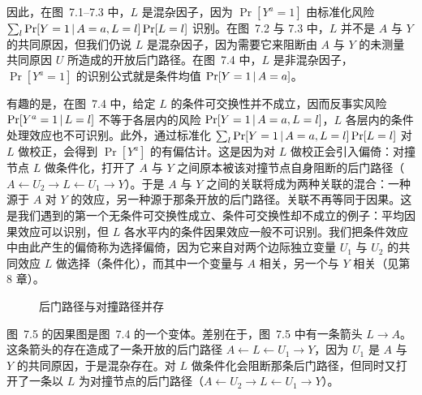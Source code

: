 因此，在图~7.1–7.3 中，$L$ 是混杂因子，因为 $\Pr[Y^{a}=1]$ 由标准化风险 $\sum_l \Pr[Y=1\,|\, A=a,L=l]\Pr[L=l]$ 识别。在图~7.2 与 7.3 中，$L$ 并不是 $A$ 与 $Y$ 的共同原因，但我们仍说 $L$ 是混杂因子，因为需要它来阻断由 $A$ 与 $Y$ 的未测量共同原因 $U$ 所造成的开放后门路径。在图~7.4 中，$L$ 是非混杂因子，$\Pr[Y^{a}=1]$ 的识别公式就是条件均值 $\Pr[Y=1\,|\, A=a]$。


有趣的是，在图~7.4 中，给定 $L$ 的条件可交换性并不成立，因而反事实风险 $\Pr[Y^{a}=1\,|\, L=l]$ 不等于各层内的风险 $\Pr[Y=1\,|\, A=a,L=l]$，$L$ 各层内的条件处理效应也不可识别。此外，通过标准化 $\sum_l \Pr[Y=1\,|\, A=a,L=l]\Pr[L=l]$ 对 $L$ 做校正，会得到 $\Pr[Y^{a}]$ 的有偏估计。这是因为对 $L$ 做校正会引入偏倚：对撞节点 $L$ 做条件化，打开了 $A$ 与 $Y$ 之间原本被该对撞节点自身阻断的后门路径（$A\leftarrow U_2\to L\leftarrow U_1\to Y$）。于是 $A$ 与 $Y$ 之间的关联将成为两种关联的混合：一种源于 $A$ 对 $Y$ 的效应，另一种源于那条开放的后门路径。关联不再等同于因果。这是我们遇到的第一个无条件可交换性成立、条件可交换性却不成立的例子：平均因果效应可以识别，但 $L$ 各水平内的条件因果效应一般不可识别。我们把条件效应中由此产生的偏倚称为选择偏倚，因为它来自对两个边际独立变量 $U_1$ 与 $U_2$ 的共同效应 $L$ 做选择（条件化），而其中一个变量与 $A$ 相关，另一个与 $Y$ 相关（见第 8 章）。

\begin{figure}[htbp]
\centering
{}
\caption{后门路径与对撞路径并存}
\label{fig:7.5}
\end{figure}

图~7.5 的因果图是图~7.4 的一个变体。差别在于，图~7.5 中有一条箭头 $L\to A$。这条箭头的存在造成了一条开放的后门路径 $A\leftarrow L\leftarrow U_1\to Y$，因为 $U_1$ 是 $A$ 与 $Y$ 的共同原因，于是混杂存在。对 $L$ 做条件化会阻断那条后门路径，但同时又打开了一条以 $L$ 为对撞节点的后门路径（$A\leftarrow U_2\to L\leftarrow U_1\to Y$）。


